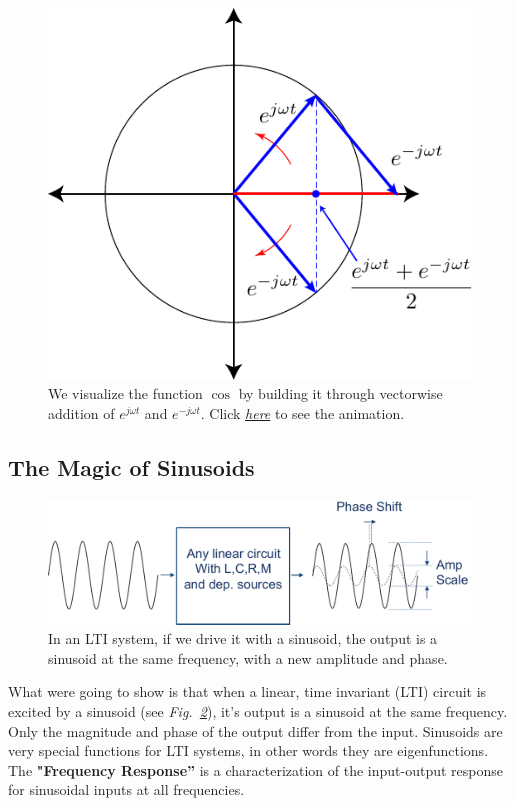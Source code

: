 \begin{figure}[tb]
\centering
\includegraphics[width=.45\columnwidth]{exp3.pdf}
\caption{We visualize the function $\cos$ by building it through vectorwise addition of $e^{j\omega t}$ and $e^{-j\omega t}$.  Click \href{http://rfic.eecs.berkeley.edu/~niknejad/photos/ee105/exp3.mov}{\emph{here}} to see the animation.}
\label{fig:cos}
\end{figure}
\subsection{The Magic of Sinusoids}
\begin{figure}[tb]
\centering
\includegraphics[width=.65\columnwidth]{lti_sine}
\caption{In an LTI system, if we drive it with a sinusoid, the output is a sinusoid at the same frequency, with a new amplitude and phase.}
\label{fig:lti_sine}
\end{figure}
What were going to show is that when a linear, time invariant (LTI) circuit is excited by a sinusoid (see \emph{Fig.~\ref{fig:lti_sine}}), it's output is a sinusoid at the same frequency.  Only the magnitude and phase of the output differ from the input.  Sinusoids are very special functions for LTI systems, in other words they are eigenfunctions.  The \textbf{"Frequency Response''} is a characterization of the input-output response for sinusoidal inputs at all frequencies.

